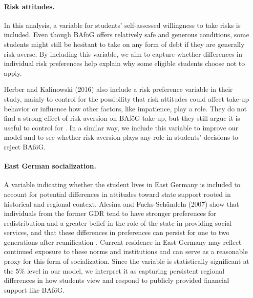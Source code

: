 \paragraph{Risk attitudes.} In this analysis, a variable for students' self-assessed willingness to take risks is included. Even though BAföG offers relatively safe and generous conditions, some students might still be hesitant to take on any form of debt if they are generally risk-averse. By including this variable, we aim to capture whether differences in individual risk preferences help explain why some eligible students choose not to apply.

Herber and Kalinowski (2016) also include a risk preference variable in their study, mainly to control for the possibility that risk attitudes could affect take-up behavior or influence how other factors, like impatience, play a role. They do not find a strong effect of risk aversion on BAföG take-up, but they still argue it is useful to control for \citep{herber_non-take-up_2019}. In a similar way, we include this variable to improve our model and to see whether risk aversion plays any role in students’ decisions to reject BAföG.

\paragraph{East German socialization.}  A variable indicating whether the student lives in East Germany is included to account for potential differences in attitudes toward state support rooted in historical and regional context. Alesina and Fuchs-Schündeln (2007) show that individuals from the former GDR tend to have stronger preferences for redistribution and a greater belief in the role of the state in providing social services, and that these differences in preferences can persist for one to two generations after reunification \citep{alesina_good-bye_2007}. Current residence in East Germany may reflect continued exposure to these norms and institutions and can serve as a reasonable proxy for this form of socialization. Since the variable is statistically significant at the 5\% level in our model, we interpret it as capturing persistent regional differences in how students view and respond to publicly provided financial support like BAföG.

